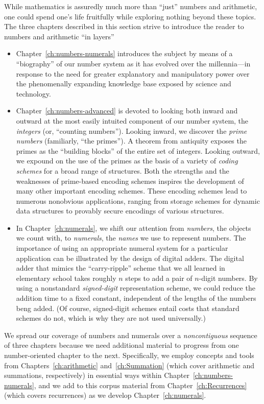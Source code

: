 While mathematics is assuredly much more than ``just'' numbers and
arithmetic, one could spend one's life fruitfully while exploring
nothing beyond these topics.  The three chapters described in this
section strive to introduce the reader to numbers and
arithmetic ``in layers''
\begin{itemize}
\item
Chapter~\ref{ch:numbers-numerals} introduces the subject by means of a
``biography'' of our number system as it has evolved over the
millennia---in response to the need for greater explanatory and
manipulatory power over the phenomenally expanding knowledge base
exposed by science and technology.
\item
Chapter~\ref{ch:numbers-advanced} is devoted to looking both inward
and outward at the most easily intuited component of our number
system, the {\em integers} (or, ``counting numbers'').  Looking
inward, we discover the {\em prime numbers} (familiarly, ``the
primes'').  A theorem from antiquity exposes the primes as the
``building blocks'' of the entire set of integers.  Looking outward,
we expound on the use of the primes as the basis of a variety of {\em
  coding schemes} for a broad range of structures.  Both the strengths
and the weaknesses of prime-based encoding schemes inspires the
development of many other important encoding schemes.  These encoding
schemes lead to numerous nonobvious applications, ranging from storage
schemes for dynamic data structures to provably secure encodings of
various structures.

\item
In Chapter~\ref{ch:numerals}, we shift our attention from {\em
  numbers}, the objects we count with, to {\em numerals}, the {\em
  names} we use to represent numbers.  The importance of using an
appropriate numeral system for a particular application can be
illustrated by the design of digital adders.  The digital adder that
mimics the ``carry-ripple'' scheme that we all learned in elementary
school takes roughly $n$ steps to add a pair of $n$-digit numbers.  By
using a nonstandard {\em signed-digit} representation scheme, we could
reduce the addition time to a fixed constant, independent of the
lengths of the numbers beng added.  (Of course, signed-digit schemes
entail costs that standard schemes do not, which is why they are not
used universally.)
\end{itemize}
We spread our coverage of numbers and numerals over a {\em
  noncontiguous} sequence of three chapters because we need additional
material to progress from one number-oriented chapter to the next.
Specifically, we employ concepts and tools from
Chapters~\ref{ch:arithmetic} and~\ref{ch:Summation} (which cover
arithmetic and summations, respectively) in essential ways within
Chapter~\ref{ch:numbers-numerals}, and we add to this corpus material
from Chapter~\ref{ch:Recurrences} (which covers recurrences) as we
develop Chapter~\ref{ch:numerals}.


